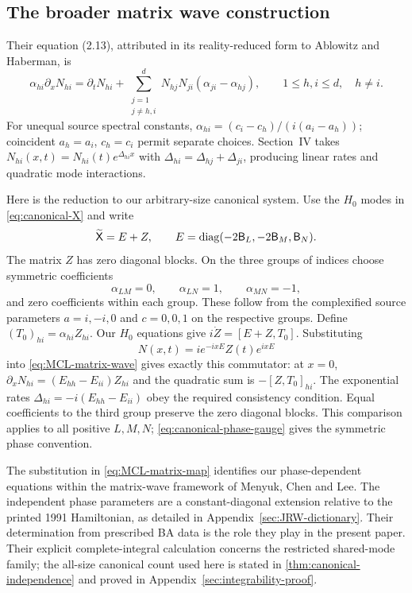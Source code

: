 \subsection{The broader matrix wave construction}

Their equation (2.13), attributed in its reality-reduced form to
Ablowitz and Haberman, is
\begin{equation}\label{eq:MCL-matrix-wave}
 \alpha_{hi}\partial_x N_{hi}
 =\partial_t N_{hi}
 +\sum_{\substack{j=1\\j\ne h,i}}^{d}
 N_{hj}N_{ji}(\alpha_{ji}-\alpha_{hj}),
 \qquad1\leq h,i\leq d,\quad h\ne i.
\end{equation}
For unequal source spectral constants,
$\alpha_{hi}=(c_i-c_h)/(i(a_i-a_h))$; coincident $a_h=a_i$,
$c_h=c_i$ permit separate choices. Section~IV takes
$N_{hi}(x,t)=N_{hi}(t)e^{\Delta_{hi}x}$ with
$\Delta_{hi}=\Delta_{hj}+\Delta_{ji}$, producing linear rates and
quadratic mode interactions.

Here is the reduction to our arbitrary-size canonical system.
Use the $H_0$ modes in \cref{eq:canonical-X} and write
\[
 \widetilde{\mathsf X}=E+Z,\qquad
 E=\operatorname{diag}(-2\mathsf B_L,-2\mathsf B_M,\mathsf B_N).
\]
The matrix $Z$ has zero diagonal blocks. On the three groups of
indices choose symmetric coefficients
\[
 \alpha_{LM}=0,\qquad\alpha_{LN}=1,\qquad
 \alpha_{MN}=-1,
\]
and zero coefficients within each group. These follow from the
complexified source parameters $a=i,-i,0$ and $c=0,0,1$ on the
respective groups. Define $(T_0)_{hi}=\alpha_{hi}Z_{hi}$.
Our $H_0$ equations give $i\dot Z=[E+Z,T_0]$. Substituting
\begin{equation}\label{eq:MCL-matrix-map}
 N(x,t)=i e^{-ixE}Z(t)e^{ixE}
\end{equation}
into \cref{eq:MCL-matrix-wave} gives exactly this commutator:
at $x=0$, $\partial_xN_{hi}=(E_{hh}-E_{ii})Z_{hi}$ and the
quadratic sum is $-[Z,T_0]_{hi}$. The exponential rates
$\Delta_{hi}=-i(E_{hh}-E_{ii})$ obey the required consistency
condition. Equal coefficients to the third group preserve the zero
diagonal blocks. This comparison applies to all positive $L,M,N$;
\cref{eq:canonical-phase-gauge} gives the symmetric phase convention.

The substitution in \cref{eq:MCL-matrix-map} identifies our
phase-dependent equations within the matrix-wave framework of
Menyuk, Chen and Lee. The independent phase parameters are a
constant-diagonal extension relative to the printed 1991 Hamiltonian,
as detailed in Appendix~\ref{sec:JRW-dictionary}. Their determination
from prescribed BA data is the role they play in the present paper.
Their explicit complete-integral calculation concerns
the restricted shared-mode family; the all-size canonical count used
here is stated in \cref{thm:canonical-independence} and proved in
Appendix~\ref{sec:integrability-proof}.

